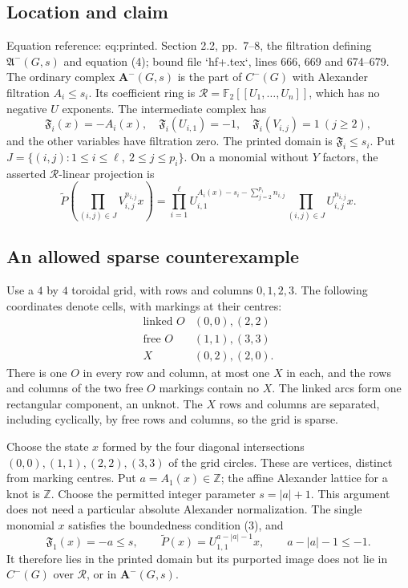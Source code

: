 \documentclass[10pt]{article}
\begin{document}
\subsection*{Location and claim}
Equation reference: eq:printed. Section 2.2, pp. 7–8, the filtration defining \(\mathfrak A^-(G,s)\) and equation (4); bound file `hf+.tex`, lines 666, 669 and 674–679. The ordinary complex \(\mathbf A^-(G,s)\) is the part of \(C^-(G)\) with Alexander filtration \(A_i\leq s_i\). Its coefficient ring is \(\mathcal R=\mathbb F_2[[U_1,\ldots,U_n]]\), which has no negative \(U\) exponents. The intermediate complex has \[\mathfrak F_i(x)=-A_i(x),\quad
 \mathfrak F_i(U_{i,1})=-1,\quad \mathfrak F_i(V_{i,j})=1\ (j\geq2),\] and the other variables have filtration zero. The printed domain is \(\mathfrak F_i\leq s_i\). Put \(J=\{(i,j):1\leq i\leq\ell,\ 2\leq j\leq p_i\}\). On a monomial without \(Y\) factors, the asserted \(\mathcal R\)-linear projection is \[
 \widetilde P\left(\prod_{(i,j)\in J}V_{i,j}^{n_{i,j}}x\right)
 =
 \prod_{i=1}^{\ell} U_{i,1}^{A_i(x)-s_i-\sum_{j=2}^{p_i}n_{i,j}}
 \prod_{(i,j)\in J}U_{i,j}^{n_{i,j}}x .\]\par
\subsection*{An allowed sparse counterexample}
Use a \(4\) by \(4\) toroidal grid, with rows and columns \(0,1,2,3\). The following coordinates denote cells, with markings at their centres: \[\begin{array}{c|l}
\text{linked }O &(0,0),(2,2)\\
\text{free }O &(1,1),(3,3)\\
X &(0,2),(2,0).
\end{array}\] There is one \(O\) in every row and column, at most one \(X\) in each, and the rows and columns of the two free \(O\) markings contain no \(X\). The linked arcs form one rectangular component, an unknot. The \(X\) rows and columns are separated, including cyclically, by free rows and columns, so the grid is sparse.\par
Choose the state \(x\) formed by the four diagonal intersections \((0,0),(1,1),(2,2),(3,3)\) of the grid circles. These are vertices, distinct from marking centres. Put \(a=A_1(x)\in\mathbb Z\); the affine Alexander lattice for a knot is \(\mathbb Z\). Choose the permitted integer parameter \(s=|a|+1\). This argument does not need a particular absolute Alexander normalization. The single monomial \(x\) satisfies the boundedness condition (3), and \[\mathfrak F_1(x)=-a\leq s,\qquad
 \widetilde P(x)=U_{1,1}^{a-|a|-1}x,\qquad a-|a|-1\leq-1.\] It therefore lies in the printed domain but its purported image does not lie in \(C^-(G)\) over \(\mathcal R\), or in \(\mathbf A^-(G,s)\).\par
\end{document}
